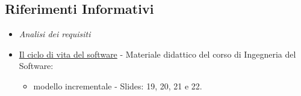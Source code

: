 \subsection{Riferimenti Informativi}
\begin{itemize}
    \item \textit{Analisi dei requisiti}
    \item \href{https://www.math.unipd.it/~tullio/IS-1/2022/Dispense/T03.pdf}{Il ciclo di vita del software} - Materiale didattico del corso di Ingegneria del Software:
    \begin{itemize}
        \item modello incrementale - Slides: 19, 20, 21 e 22.
    \end{itemize}
\end{itemize}

